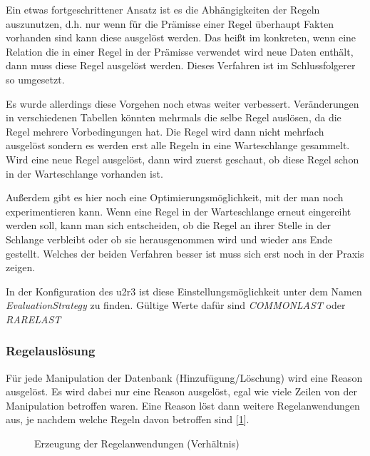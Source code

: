 Ein etwas fortgeschrittener Ansatz ist es die Abhängigkeiten der Regeln auszunutzen, d.h. nur wenn für die Prämisse einer Regel überhaupt Fakten vorhanden sind kann diese ausgelöst werden. Das heißt im konkreten, wenn eine Relation die in einer Regel in der Prämisse verwendet wird neue Daten enthält, dann muss diese Regel ausgelöst werden. Dieses Verfahren ist im Schlussfolgerer so umgesetzt.

Es wurde allerdings diese Vorgehen noch etwas weiter verbessert. Veränderungen in verschiedenen Tabellen könnten mehrmals die selbe Regel auslösen, da die Regel mehrere Vorbedingungen  hat. Die Regel wird dann nicht mehrfach ausgelöst sondern es werden erst alle Regeln in eine Warteschlange gesammelt. Wird eine neue Regel ausgelöst, dann wird zuerst geschaut, ob diese Regel schon in der Warteschlange vorhanden ist.

Außerdem gibt es hier noch eine Optimierungsmöglichkeit, mit der man noch experimentieren kann. Wenn eine Regel in der Warteschlange erneut eingereiht werden soll, kann man sich entscheiden, ob die Regel an ihrer Stelle in der Schlange verbleibt oder ob sie herausgenommen wird und wieder ans Ende gestellt. Welches der beiden Verfahren besser ist muss sich erst noch in der Praxis zeigen.

In der Konfiguration des u2r3 ist diese Einstellungsmöglichkeit unter dem Namen \emph{EvaluationStrategy} zu finden. Gültige Werte dafür sind \emph{COMMONLAST} oder \emph{RARELAST}

\subsubsection{Regelauslösung}
Für jede Manipulation der Datenbank (Hinzufügung/Löschung) wird eine Reason ausgelöst. Es wird dabei nur eine Reason ausgelöst, egal wie viele Zeilen von der Manipulation betroffen waren. Eine Reason löst dann weitere Regelanwendungen aus, je nachdem welche Regeln davon betroffen sind [\ref{diagram-ruleexecution1}].

\begin{figure}[htp]
\begin{center}
  \caption{Erzeugung der Regelanwendungen (Verhältnis)}
  \label{diagram-ruleexecution1}
\end{center}
\end{figure}

